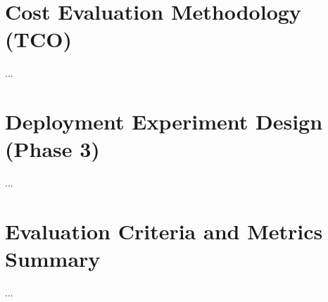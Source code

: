 \section{Cost Evaluation Methodology (TCO)}
\label{sec:tco_methodology}

...


\section{Deployment Experiment Design (Phase 3)}
\label{sec:deployment_methodology}

...


\section{Evaluation Criteria and Metrics Summary}
\label{sec:evaluation_criteria}

...
